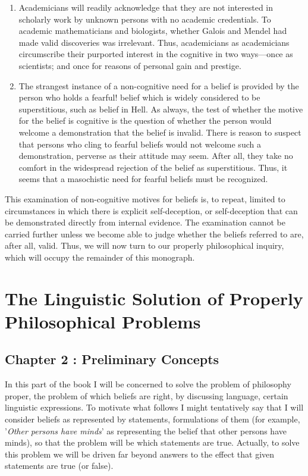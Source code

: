 \documentclass[10pt,twoside,draft]{memoir}
\newcommand{\formulation}[1]{'\textit{#1}'}
\begin{document}
\begin{enumerate}
\item Academicians will readily acknowledge that they are not interested 
in scholarly work by unknown persons with no academic credentials. To 
academic mathematicians and biologists, whether Galois and Mendel had 
made valid discoveries was irrelevant. Thus, academicians as academicians 
circumscribe their purported interest in the cognitive in two ways---once as 
scientists; and once for reasons of personal gain and prestige. 

\item The strangest instance of a non-cognitive need for a belief is 
provided by the person who holds a fearful! belief which is widely considered 
to be superstitious, such as belief in Hell. As always, the test of whether the 
motive for the belief is cognitive is the question of whether the person would 
welcome a demonstration that the belief is invalid. There is reason to suspect 
that persons who cling to fearful beliefs would not welcome such a 
demonstration, perverse as their attitude may seem. After all, they take no 
comfort in the widespread rejection of the belief as superstitious. Thus, it 
seems that a masochistic need for fearful beliefs must be recognized. 
\end{enumerate}

This examination of non-cognitive motives for beliefs is, to repeat, 
limited to circumstances in which there is explicit self-deception, or 
self-deception that can be demonstrated directly from internal evidence. The 
examination cannot be carried further unless we become able to judge 
whether the beliefs referred to are, after all, valid. Thus, we will now turn to 
our properly philosophical inquiry, which will occupy the remainder of this 
monograph. 


\section{The Linguistic Solution of Properly Philosophical Problems}
\subsection*{Chapter 2 : Preliminary Concepts}

In this part of the book I will be concerned to solve the problem of 
philosophy proper, the problem of which beliefs are right, by discussing 
language, certain linguistic expressions. To motivate what follows I might 
tentatively say that I will consider beliefs as represented by statements, 
formulations of them (for example, \formulation{Other persons have minds} as 
representing the belief that other persons have minds), so that the problem 
will be which statements are true. Actually, to solve this problem we will be 
driven far beyond answers to the effect that given statements are true (or 
false). 
\end{document}

